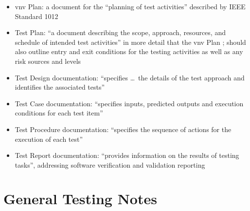 \begin{itemize}
    \item \acf{vnv} Plan: a document for the ``planning of test activities''
          described by IEEE Standard 1012 \citep[p.~411]{vanVliet2000}
    \item Test Plan: ``a document describing the scope, approach, resources,
          and schedule of intended test activities'' in more detail that the
          \acs{vnv} Plan \citep[pp.~412-413]{vanVliet2000};
          should also outline entry and exit conditions for the testing
          activities as well as any risk sources and levels
          \citep[p.~445]{PetersAndPedrycz2000}
    \item Test Design documentation: ``specifies \dots\ the details of the
          test approach and identifies the associated tests''
          \citep[p.~413]{vanVliet2000}
    \item Test Case documentation: ``specifies inputs, predicted outputs and
          execution conditions for each test item''
          \citep[p.~413]{vanVliet2000}
    \item Test Procedure documentation: ``specifies the sequence of actions
          for the execution of each test'' \citep[p.~413]{vanVliet2000}
    \item Test Report documentation: ``provides information on the results of
          testing tasks'', addressing software verification and validation
          reporting \citep[p.~413]{vanVliet2000}
\end{itemize}

\section{General Testing Notes}

